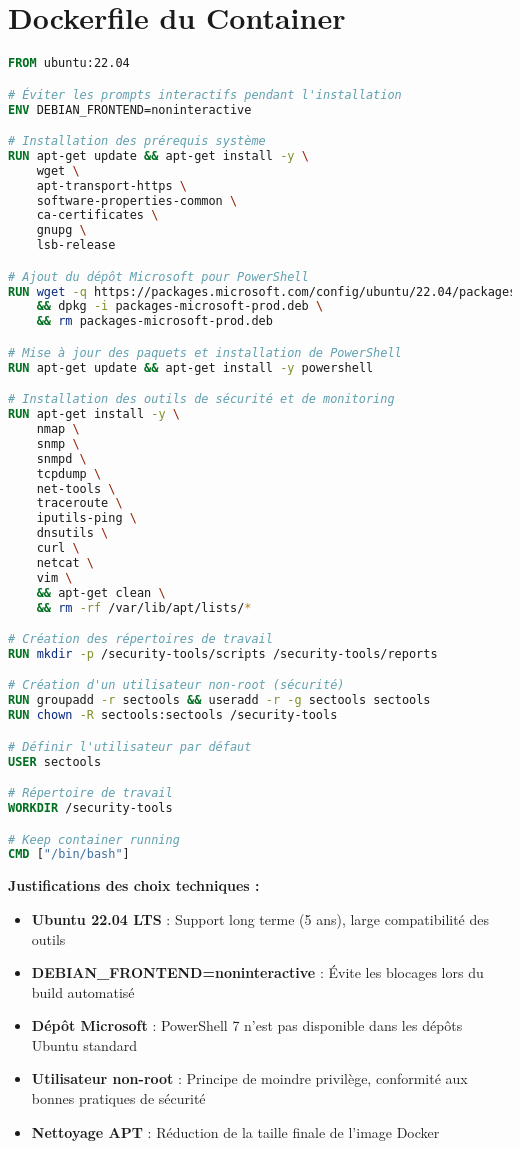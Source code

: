\documentclass[11pt,a4paper]{report}
\begin{document}
\section{Dockerfile du Container}

\begin{lstlisting}[language=Dockerfile, caption=Dockerfile du Container Security Tools, basicstyle=\ttfamily\tiny]
FROM ubuntu:22.04

# Éviter les prompts interactifs pendant l'installation
ENV DEBIAN_FRONTEND=noninteractive

# Installation des prérequis système
RUN apt-get update && apt-get install -y \
    wget \
    apt-transport-https \
    software-properties-common \
    ca-certificates \
    gnupg \
    lsb-release

# Ajout du dépôt Microsoft pour PowerShell
RUN wget -q https://packages.microsoft.com/config/ubuntu/22.04/packages-microsoft-prod.deb \
    && dpkg -i packages-microsoft-prod.deb \
    && rm packages-microsoft-prod.deb

# Mise à jour des paquets et installation de PowerShell
RUN apt-get update && apt-get install -y powershell

# Installation des outils de sécurité et de monitoring
RUN apt-get install -y \
    nmap \
    snmp \
    snmpd \
    tcpdump \
    net-tools \
    traceroute \
    iputils-ping \
    dnsutils \
    curl \
    netcat \
    vim \
    && apt-get clean \
    && rm -rf /var/lib/apt/lists/*

# Création des répertoires de travail
RUN mkdir -p /security-tools/scripts /security-tools/reports

# Création d'un utilisateur non-root (sécurité)
RUN groupadd -r sectools && useradd -r -g sectools sectools
RUN chown -R sectools:sectools /security-tools

# Définir l'utilisateur par défaut
USER sectools

# Répertoire de travail
WORKDIR /security-tools

# Keep container running
CMD ["/bin/bash"]
\end{lstlisting}

\textbf{Justifications des choix techniques :}
\begin{itemize}
    \item \textbf{Ubuntu 22.04 LTS} : Support long terme (5 ans), large compatibilité des outils
    \item \textbf{DEBIAN\_FRONTEND=noninteractive} : Évite les blocages lors du build automatisé
    \item \textbf{Dépôt Microsoft} : PowerShell 7 n'est pas disponible dans les dépôts Ubuntu standard
    \item \textbf{Utilisateur non-root} : Principe de moindre privilège, conformité aux bonnes pratiques de sécurité
    \item \textbf{Nettoyage APT} : Réduction de la taille finale de l'image Docker
\end{itemize}
\end{document}

